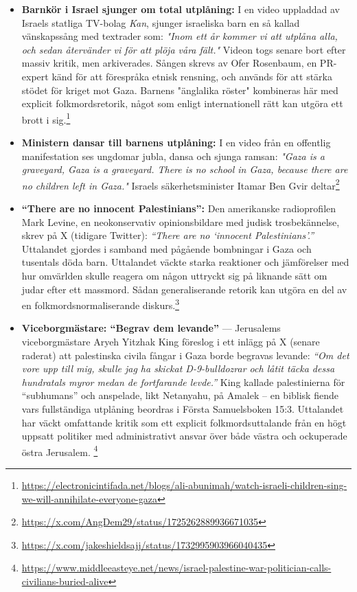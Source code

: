\documentclass[12pt]{article}
\begin{document}
\begin{itemize}
\item \textbf{Barnkör i Israel sjunger om total utplåning:} I en video uppladdad av Israels statliga TV-bolag \textit{Kan}, sjunger israeliska barn en så kallad vänskapssång med textrader som: \textit{"Inom ett år kommer vi att utplåna alla, och sedan återvänder vi för att plöja våra fält."} Videon togs senare bort efter massiv kritik, men arkiverades. Sången skrevs av Ofer Rosenbaum, en PR-expert känd för att förespråka etnisk rensning, och används för att stärka stödet för kriget mot Gaza. Barnens "änglalika röster" kombineras här med explicit folkmordsretorik, något som enligt internationell rätt kan utgöra ett brott i sig.\footnote{\url{https://electronicintifada.net/blogs/ali-abunimah/watch-israeli-children-sing-we-will-annihilate-everyone-gaza}}

\item \textbf{Ministern dansar till barnens utplåning:} I en video från en offentlig manifestation ses ungdomar jubla, dansa och sjunga ramsan: \textit{"Gaza is a graveyard, Gaza is a graveyard. There is no school in Gaza, because there are no children left in Gaza."} Israels säkerhetsminister Itamar Ben Gvir deltar\footnote{\url{https://x.com/AngDem29/status/1725262889936671035}}

\item \textbf{“There are no innocent Palestinians”:} Den amerikanske radioprofilen Mark Levine, en neokonservativ opinionsbildare med judisk trosbekännelse, skrev på X (tidigare Twitter): \textit{“There are no ‘innocent Palestinians’.”} Uttalandet gjordes i samband med pågående bombningar i Gaza och tusentals döda barn. Uttalandet väckte starka reaktioner och jämförelser med hur omvärlden skulle reagera om någon uttryckt sig på liknande sätt om judar efter ett massmord. Sådan generaliserande retorik kan utgöra en del av en folkmordsnormaliserande diskurs.\footnote{\url{https://x.com/jakeshieldsajj/status/1732995903966040435}}

\item \textbf{Viceborgmästare: “Begrav dem levande”} — Jerusalems viceborgmästare Aryeh Yitzhak King föreslog i ett inlägg på X (senare raderat) att palestinska civila fångar i Gaza borde begravas levande: \textit{“Om det vore upp till mig, skulle jag ha skickat D-9-bulldozrar och låtit täcka dessa hundratals myror medan de fortfarande levde.”} King kallade palestinierna för “subhumans” och anspelade, likt Netanyahu, på Amalek – en biblisk fiende vars fullständiga utplåning beordras i Första Samuelsboken 15:3. Uttalandet har väckt omfattande kritik som ett explicit folkmordsuttalande från en högt uppsatt politiker med administrativt ansvar över både västra och ockuperade östra Jerusalem. \footnote{\url{https://www.middleeasteye.net/news/israel-palestine-war-politician-calls-civilians-buried-alive}}


\end{itemize}
\end{document}
